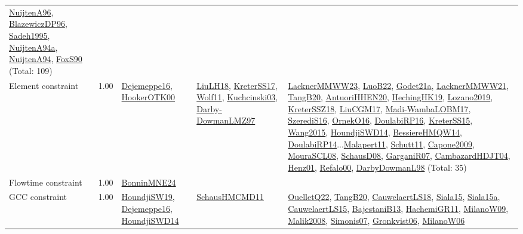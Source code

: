 {\begin{longtable}{p{3cm}r>{\raggedright\arraybackslash}p{6cm}>{\raggedright\arraybackslash}p{6cm}>{\raggedright\arraybackslash}p{8cm}}
\hyperref[detail:NuijtenA96]{NuijtenA96}, \hyperref[detail:BlazewiczDP96]{BlazewiczDP96}, \hyperref[detail:Sadeh1995]{Sadeh1995}, \hyperref[detail:NuijtenA94a]{NuijtenA94a}, \hyperref[detail:NuijtenA94]{NuijtenA94}, \hyperref[detail:FoxS90]{FoxS90} (Total: 109)\\
\index{Element constraint}\index{Constraints!Element constraint}Element constraint &  1.00 & \hyperref[detail:Dejemeppe16]{Dejemeppe16}, \hyperref[detail:HookerOTK00]{HookerOTK00} & \hyperref[detail:LiuLH18]{LiuLH18}, \hyperref[detail:KreterSS17]{KreterSS17}, \hyperref[detail:Wolf11]{Wolf11}, \hyperref[detail:Kuchcinski03]{Kuchcinski03}, \hyperref[detail:Darby-DowmanLMZ97]{Darby-DowmanLMZ97} & \hyperref[detail:LacknerMMWW23]{LacknerMMWW23}, \hyperref[detail:LuoB22]{LuoB22}, \hyperref[detail:Godet21a]{Godet21a}, \hyperref[detail:LacknerMMWW21]{LacknerMMWW21}, \hyperref[detail:TangB20]{TangB20}, \hyperref[detail:AntuoriHHEN20]{AntuoriHHEN20}, \hyperref[detail:HechingHK19]{HechingHK19}, \hyperref[detail:Lozano2019]{Lozano2019}, \hyperref[detail:KreterSSZ18]{KreterSSZ18}, \hyperref[detail:LiuCGM17]{LiuCGM17}, \hyperref[detail:Madi-WambaLOBM17]{Madi-WambaLOBM17}, \hyperref[detail:SzerediS16]{SzerediS16}, \hyperref[detail:OrnekO16]{OrnekO16}, \hyperref[detail:DoulabiRP16]{DoulabiRP16}, \hyperref[detail:KreterSS15]{KreterSS15}, \hyperref[detail:Wang2015]{Wang2015}, \hyperref[detail:HoundjiSWD14]{HoundjiSWD14}, \hyperref[detail:BessiereHMQW14]{BessiereHMQW14}, \hyperref[detail:DoulabiRP14]{DoulabiRP14}...\hyperref[detail:Malapert11]{Malapert11}, \hyperref[detail:Schutt11]{Schutt11}, \hyperref[detail:Capone2009]{Capone2009}, \hyperref[detail:MouraSCL08]{MouraSCL08}, \hyperref[detail:SchausD08]{SchausD08}, \hyperref[detail:GarganiR07]{GarganiR07}, \hyperref[detail:CambazardHDJT04]{CambazardHDJT04}, \hyperref[detail:Henz01]{Henz01}, \hyperref[detail:Refalo00]{Refalo00}, \hyperref[detail:DarbyDowmanL98]{DarbyDowmanL98} (Total: 35)\\
\index{Flowtime constraint}\index{Constraints!Flowtime constraint}Flowtime constraint &  1.00 & \hyperref[detail:BonninMNE24]{BonninMNE24} &  & \\
\index{GCC constraint}\index{Constraints!GCC constraint}GCC constraint &  1.00 & \hyperref[detail:HoundjiSW19]{HoundjiSW19}, \hyperref[detail:Dejemeppe16]{Dejemeppe16}, \hyperref[detail:HoundjiSWD14]{HoundjiSWD14} & \hyperref[detail:SchausHMCMD11]{SchausHMCMD11} & \hyperref[detail:OuelletQ22]{OuelletQ22}, \hyperref[detail:TangB20]{TangB20}, \hyperref[detail:CauwelaertLS18]{CauwelaertLS18}, \hyperref[detail:Siala15]{Siala15}, \hyperref[detail:Siala15a]{Siala15a}, \hyperref[detail:CauwelaertLS15]{CauwelaertLS15}, \hyperref[detail:BajestaniB13]{BajestaniB13}, \hyperref[detail:HachemiGR11]{HachemiGR11}, \hyperref[detail:MilanoW09]{MilanoW09}, \hyperref[detail:Malik2008]{Malik2008}, \hyperref[detail:Simonis07]{Simonis07}, \hyperref[detail:Gronkvist06]{Gronkvist06}, \hyperref[detail:MilanoW06]{MilanoW06}\\

\end{longtable}}

